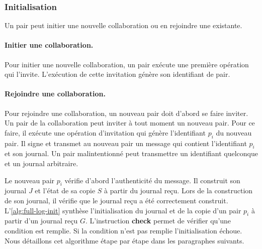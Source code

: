 \subsubsection{Initialisation}

Un pair peut initier une nouvelle collaboration ou en rejoindre une existante.

\paragraph{Initier une collaboration.}
Pour initier une nouvelle collaboration, un pair exécute une première opération qui l'invite.
L'exécution de cette invitation génère son identifiant de pair.


\paragraph{Rejoindre une collaboration.}
Pour rejoindre une collaboration, un nouveau pair doit d'abord se faire inviter.
Un pair de la collaboration peut inviter à tout moment un nouveau pair.
Pour ce faire, il exécute une opération d'invitation qui génère l'identifiant $p_i$ du nouveau pair.
Il signe et transmet au nouveau pair un message qui contient l'identifiant $p_i$ et son journal.
Un pair malintentionné peut transmettre un identifiant quelconque et un journal arbitraire.

Le nouveau pair $p_i$ vérifie d'abord l'authenticité du message.
Il construit son journal $J$ et l'état de sa copie $S$ à partir du journal reçu.
Lors de la construction de son journal, il vérifie que le journal reçu a été correctement construit.
L'\autoref{alg:full-log-init} synthèse l'initialisation du journal et de la copie d'un pair $p_i$ à partir d'un journal reçu $G$.
L'instruction \textbf{check} permet de vérifier qu'une condition est remplie.
Si la condition n'est pas remplie l'initialisation échoue.
Nous détaillons cet algorithme étape par étape dans les paragraphes suivants.

